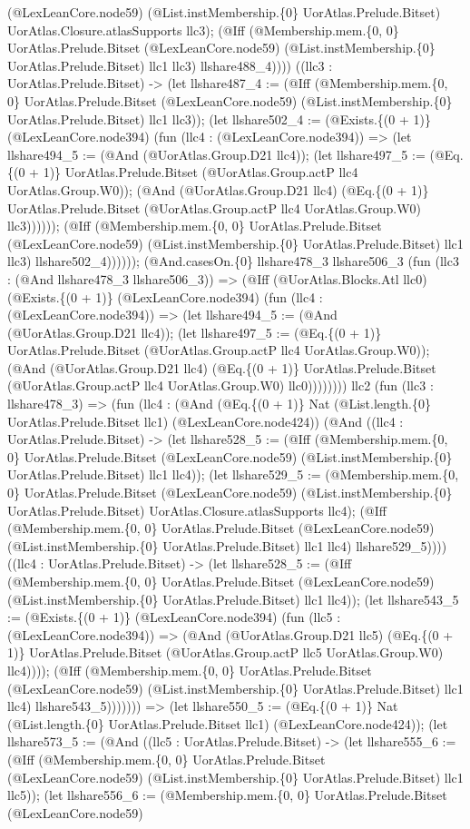 \documentclass[11pt]{article}
\begin{document}
(@LexLeanCore.node59) (@List.instMembership.\{0\} UorAtlas.Prelude.Bitset) UorAtlas.Closure.atlasSupports llc3); (@Iff (@Membership.mem.\{0, 0\} UorAtlas.Prelude.Bitset (@LexLeanCore.node59) (@List.instMembership.\{0\} UorAtlas.Prelude.Bitset) llc1 llc3) llshare488\_4)))) ((llc3 : UorAtlas.Prelude.Bitset) -> (let llshare487\_4 := (@Iff (@Membership.mem.\{0, 0\} UorAtlas.Prelude.Bitset (@LexLeanCore.node59) (@List.instMembership.\{0\} UorAtlas.Prelude.Bitset) llc1 llc3)); (let llshare502\_4 := (@Exists.\{(0 + 1)\} (@LexLeanCore.node394) (fun (llc4 : (@LexLeanCore.node394)) => (let llshare494\_5 := (@And (@UorAtlas.Group.D21 llc4)); (let llshare497\_5 := (@Eq.\{(0 + 1)\} UorAtlas.Prelude.Bitset (@UorAtlas.Group.actP llc4 UorAtlas.Group.W0)); (@And (@UorAtlas.Group.D21 llc4) (@Eq.\{(0 + 1)\} UorAtlas.Prelude.Bitset (@UorAtlas.Group.actP llc4 UorAtlas.Group.W0) llc3)))))); (@Iff (@Membership.mem.\{0, 0\} UorAtlas.Prelude.Bitset (@LexLeanCore.node59) (@List.instMembership.\{0\} UorAtlas.Prelude.Bitset) llc1 llc3) llshare502\_4)))))); (@And.casesOn.\{0\} llshare478\_3 llshare506\_3 (fun (llc3 : (@And llshare478\_3 llshare506\_3)) => (@Iff (@UorAtlas.Blocks.Atl llc0) (@Exists.\{(0 + 1)\} (@LexLeanCore.node394) (fun (llc4 : (@LexLeanCore.node394)) => (let llshare494\_5 := (@And (@UorAtlas.Group.D21 llc4)); (let llshare497\_5 := (@Eq.\{(0 + 1)\} UorAtlas.Prelude.Bitset (@UorAtlas.Group.actP llc4 UorAtlas.Group.W0)); (@And (@UorAtlas.Group.D21 llc4) (@Eq.\{(0 + 1)\} UorAtlas.Prelude.Bitset (@UorAtlas.Group.actP llc4 UorAtlas.Group.W0) llc0)))))))) llc2 (fun (llc3 : llshare478\_3) => (fun (llc4 : (@And (@Eq.\{(0 + 1)\} Nat (@List.length.\{0\} UorAtlas.Prelude.Bitset llc1) (@LexLeanCore.node424)) (@And ((llc4 : UorAtlas.Prelude.Bitset) -> (let llshare528\_5 := (@Iff (@Membership.mem.\{0, 0\} UorAtlas.Prelude.Bitset (@LexLeanCore.node59) (@List.instMembership.\{0\} UorAtlas.Prelude.Bitset) llc1 llc4)); (let llshare529\_5 := (@Membership.mem.\{0, 0\} UorAtlas.Prelude.Bitset (@LexLeanCore.node59) (@List.instMembership.\{0\} UorAtlas.Prelude.Bitset) UorAtlas.Closure.atlasSupports llc4); (@Iff (@Membership.mem.\{0, 0\} UorAtlas.Prelude.Bitset (@LexLeanCore.node59) (@List.instMembership.\{0\} UorAtlas.Prelude.Bitset) llc1 llc4) llshare529\_5)))) ((llc4 : UorAtlas.Prelude.Bitset) -> (let llshare528\_5 := (@Iff (@Membership.mem.\{0, 0\} UorAtlas.Prelude.Bitset (@LexLeanCore.node59) (@List.instMembership.\{0\} UorAtlas.Prelude.Bitset) llc1 llc4)); (let llshare543\_5 := (@Exists.\{(0 + 1)\} (@LexLeanCore.node394) (fun (llc5 : (@LexLeanCore.node394)) => (@And (@UorAtlas.Group.D21 llc5) (@Eq.\{(0 + 1)\} UorAtlas.Prelude.Bitset (@UorAtlas.Group.actP llc5 UorAtlas.Group.W0) llc4)))); (@Iff (@Membership.mem.\{0, 0\} UorAtlas.Prelude.Bitset (@LexLeanCore.node59) (@List.instMembership.\{0\} UorAtlas.Prelude.Bitset) llc1 llc4) llshare543\_5))))))) => (let llshare550\_5 := (@Eq.\{(0 + 1)\} Nat (@List.length.\{0\} UorAtlas.Prelude.Bitset llc1) (@LexLeanCore.node424)); (let llshare573\_5 := (@And ((llc5 : UorAtlas.Prelude.Bitset) -> (let llshare555\_6 := (@Iff (@Membership.mem.\{0, 0\} UorAtlas.Prelude.Bitset (@LexLeanCore.node59) (@List.instMembership.\{0\} UorAtlas.Prelude.Bitset) llc1 llc5)); (let llshare556\_6 := (@Membership.mem.\{0, 0\} UorAtlas.Prelude.Bitset (@LexLeanCore.node59) 
\end{document}
